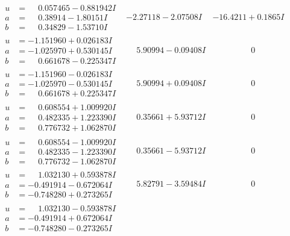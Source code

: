 \documentclass[1p]{elsarticle_modified}
\theoremstyle{definition}
\begin{document}
$$\begin{array}{c|c|c}
\begin{aligned}
u &= \phantom{-}0.057465 - 0.881942 I \\
a &= \phantom{-}0.38914 - 1.80151 I \\
b &= \phantom{-}0.34829 - 1.53710 I\end{aligned}
 & -2.27118 - 2.07508 I & -16.4211 + 0.1865 I \\ \hline\begin{aligned}
u &= -1.151960 + 0.026183 I \\
a &= -1.025970 + 0.530145 I \\
b &= \phantom{-}0.661678 - 0.225347 I\end{aligned}
 & \phantom{-}5.90994 - 0.09408 I & \phantom{-0.000000 } 0 \\ \hline\begin{aligned}
u &= -1.151960 - 0.026183 I \\
a &= -1.025970 - 0.530145 I \\
b &= \phantom{-}0.661678 + 0.225347 I\end{aligned}
 & \phantom{-}5.90994 + 0.09408 I & \phantom{-0.000000 } 0 \\ \hline\begin{aligned}
u &= \phantom{-}0.608554 + 1.009920 I \\
a &= \phantom{-}0.482335 + 1.223390 I \\
b &= \phantom{-}0.776732 + 1.062870 I\end{aligned}
 & \phantom{-}0.35661 + 5.93712 I & \phantom{-0.000000 } 0 \\ \hline\begin{aligned}
u &= \phantom{-}0.608554 - 1.009920 I \\
a &= \phantom{-}0.482335 - 1.223390 I \\
b &= \phantom{-}0.776732 - 1.062870 I\end{aligned}
 & \phantom{-}0.35661 - 5.93712 I & \phantom{-0.000000 } 0 \\ \hline\begin{aligned}
u &= \phantom{-}1.032130 + 0.593878 I \\
a &= -0.491914 - 0.672064 I \\
b &= -0.748280 + 0.273265 I\end{aligned}
 & \phantom{-}5.82791 - 3.59484 I & \phantom{-0.000000 } 0 \\ \hline\begin{aligned}
u &= \phantom{-}1.032130 - 0.593878 I \\
a &= -0.491914 + 0.672064 I \\
b &= -0.748280 - 0.273265 I\end{aligned}

\end{array}$$
\end{document}
